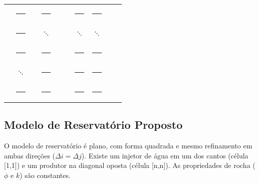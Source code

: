 \documentclass[final,5p]{elsarticle}
\numberwithin{equation}{section}
\begin{document}
\begin{table}
\begin{tabularx}{0.35\textwidth}{|XXXXXXXXXX|}
                \textcolor{white}{\rule{0.5em}{0.5em}} & \textcolor{white}{\rule{0.5em}{0.5em}} & \textcolor{gray}{\rule{0.5em}{0.5em}}  & \textcolor{white}{\rule{0.5em}{0.5em}} & \textcolor{black}{\rule{0.5em}{0.5em}} & \textcolor{black}{\rule{0.5em}{0.5em}} & \textcolor{gray}{\rule{0.5em}{0.5em}}  & \textcolor{white}{\rule{0.5em}{0.5em}} & \textcolor{white}{\rule{0.5em}{0.5em}} & \textcolor{white}{\rule{0.5em}{0.5em}}  \\
                \textcolor{gray}{\rule{0.5em}{0.5em}}  & \textcolor{white}{\rule{0.5em}{0.5em}} & \textcolor{white}{\rule{0.5em}{0.5em}} & $\ddots$                               & \textcolor{white}{\rule{0.5em}{0.5em}} & \textcolor{white}{\rule{0.5em}{0.5em}} & $\ddots$                               & $\ddots$                               & \textcolor{white}{\rule{0.5em}{0.5em}} & \textcolor{white}{\rule{0.5em}{0.5em}}  \\
                \textcolor{gray}{\rule{0.5em}{0.5em}}  & \textcolor{white}{\rule{0.5em}{0.5em}} & \textcolor{white}{\rule{0.5em}{0.5em}} & \textcolor{white}{\rule{0.5em}{0.5em}} & \textcolor{white}{\rule{0.5em}{0.5em}} & \textcolor{white}{\rule{0.5em}{0.5em}} & \textcolor{white}{\rule{0.5em}{0.5em}} & \textcolor{white}{\rule{0.5em}{0.5em}} & \textcolor{white}{\rule{0.5em}{0.5em}} & \textcolor{white}{\rule{0.5em}{0.5em}}  \\
                \textcolor{white}{\rule{0.5em}{0.5em}} & $\ddots$                               & \textcolor{white}{\rule{0.5em}{0.5em}} & \textcolor{white}{\rule{0.5em}{0.5em}} & \textcolor{white}{\rule{0.5em}{0.5em}} & \textcolor{white}{\rule{0.5em}{0.5em}} & \textcolor{gray}{\rule{0.5em}{0.5em}}  & \textcolor{white}{\rule{0.5em}{0.5em}} & \textcolor{black}{\rule{0.5em}{0.5em}} & \textcolor{black}{\rule{0.5em}{0.5em}}  \\
                \textcolor{white}{\rule{0.5em}{0.5em}} & \textcolor{white}{\rule{0.5em}{0.5em}} & \textcolor{white}{\rule{0.5em}{0.5em}} & \textcolor{white}{\rule{0.5em}{0.5em}} & \textcolor{white}{\rule{0.5em}{0.5em}} & \textcolor{white}{\rule{0.5em}{0.5em}} & \textcolor{gray}{\rule{0.5em}{0.5em}}  & \textcolor{white}{\rule{0.5em}{0.5em}} & \textcolor{black}{\rule{0.5em}{0.5em}} & \textcolor{black}{\rule{0.5em}{0.5em}}  \\
            \end{tabularx}
        \end{table}

        \subsection{Modelo de Reservatório Proposto}
            O modelo de reservatório é plano, com forma quadrada e mesmo refinamento em ambas direções ($\Delta i = \Delta j$). Existe um injetor de água em um dos cantos (célula [1,1]) e um produtor na diagonal oposta (célula [n,n]). As propriedades de rocha ($\phi$ e $k$) são constantes.
\end{document}
